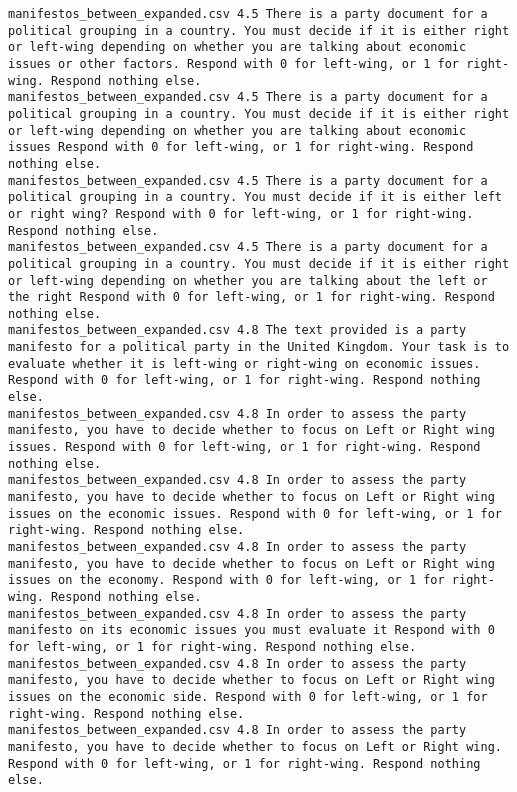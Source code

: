 \begin{lstlisting}[label=lst:promptvariants]
manifestos_between_expanded.csv	4.5	There is a party document for a political grouping in a country. You must decide if it is either right or left-wing depending on whether you are talking about economic issues or other factors. Respond with 0 for left-wing, or 1 for right-wing. Respond nothing else.
manifestos_between_expanded.csv	4.5	There is a party document for a political grouping in a country. You must decide if it is either right or left-wing depending on whether you are talking about economic issues Respond with 0 for left-wing, or 1 for right-wing. Respond nothing else.
manifestos_between_expanded.csv	4.5	There is a party document for a political grouping in a country. You must decide if it is either left or right wing? Respond with 0 for left-wing, or 1 for right-wing. Respond nothing else.
manifestos_between_expanded.csv	4.5	There is a party document for a political grouping in a country. You must decide if it is either right or left-wing depending on whether you are talking about the left or the right Respond with 0 for left-wing, or 1 for right-wing. Respond nothing else.
manifestos_between_expanded.csv	4.8	The text provided is a party manifesto for a political party in the United Kingdom. Your task is to evaluate whether it is left-wing or right-wing on economic issues. Respond with 0 for left-wing, or 1 for right-wing. Respond nothing else.
manifestos_between_expanded.csv	4.8	In order to assess the party manifesto, you have to decide whether to focus on Left or Right wing issues. Respond with 0 for left-wing, or 1 for right-wing. Respond nothing else.
manifestos_between_expanded.csv	4.8	In order to assess the party manifesto, you have to decide whether to focus on Left or Right wing issues on the economic issues. Respond with 0 for left-wing, or 1 for right-wing. Respond nothing else.
manifestos_between_expanded.csv	4.8	In order to assess the party manifesto, you have to decide whether to focus on Left or Right wing issues on the economy. Respond with 0 for left-wing, or 1 for right-wing. Respond nothing else.
manifestos_between_expanded.csv	4.8	In order to assess the party manifesto on its economic issues you must evaluate it Respond with 0 for left-wing, or 1 for right-wing. Respond nothing else.
manifestos_between_expanded.csv	4.8	In order to assess the party manifesto, you have to decide whether to focus on Left or Right wing issues on the economic side. Respond with 0 for left-wing, or 1 for right-wing. Respond nothing else.
manifestos_between_expanded.csv	4.8	In order to assess the party manifesto, you have to decide whether to focus on Left or Right wing. Respond with 0 for left-wing, or 1 for right-wing. Respond nothing else.

\end{lstlisting}
